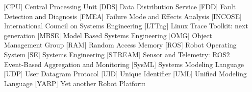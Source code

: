 \begin{acronym}[STREAMS]
          [CPU]       {Central Processing Unit}
          [DDS]       {Data Distribution Service}
          [FDD]       {Fault Detection and Diagnosis}
         [FMEA]      {Failure Mode and Effects Analysis}
       [INCOSE]    {International Council on Systems Engineering}
        [LTTng]     {Linux Trace Toolkit: next generation}
         [MBSE]      {Model Based Systems Engineering}
          [OMG]       {Object Management Group}
          [RAM]       {Random Access Memory}
          [ROS]       {Robot Operating System}
           [SE]        {Systems Engineering}
       [STREAM]    {Sensor and Telemetry: ROS2 Event-Based Aggregation and Monitoring}
        [SysML]     {Systems Modeling Language}
          [UDP]       {User Datagram Protocol}
          [UID]       {Unique Identifier}
          [UML]       {Unified Modeling Language}
         [YARP]      {Yet another Robot Platform}
\end{acronym}
